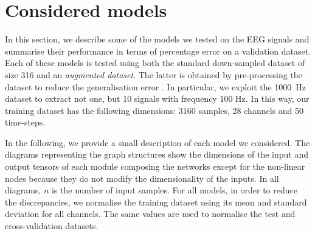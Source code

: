 \documentclass{article}
\begin{document}
 

 \section{Considered models}\label{sec_allmodel}
 In this section, we describe some of the models we tested on the EEG signals and summarise their performance in terms of percentage error on a validation dataset. 
 Each of these models is tested using both the standard down-sampled dataset of size 316 and an \emph{augmented dataset}. 
 The latter is obtained by pre-processing the dataset to reduce the generalisation error \cite{goodfellow2016deep}. In particular, we exploit the 1000~Hz dataset to extract not one, but 10  signals with frequency 100 Hz. 
In this way, our training dataset has the following dimensions: 3160 samples, 28 channels and 50 time-steps. 

In the following, we provide a small description of each model we considered. 
The diagrams representing the graph structures show the dimensions of the input and output tensors of each module composing the networks except for the non-linear nodes because they do not modify the dimensionality of the inputs.
In all diagrams, $n$ is the number of input samples.
For all models,    in order to reduce the discrepancies, we  normalise the training dataset using its mean and standard deviation for all channels. 
  The same values are used to normalise the test and cross-validation datasets. 
\end{document}
